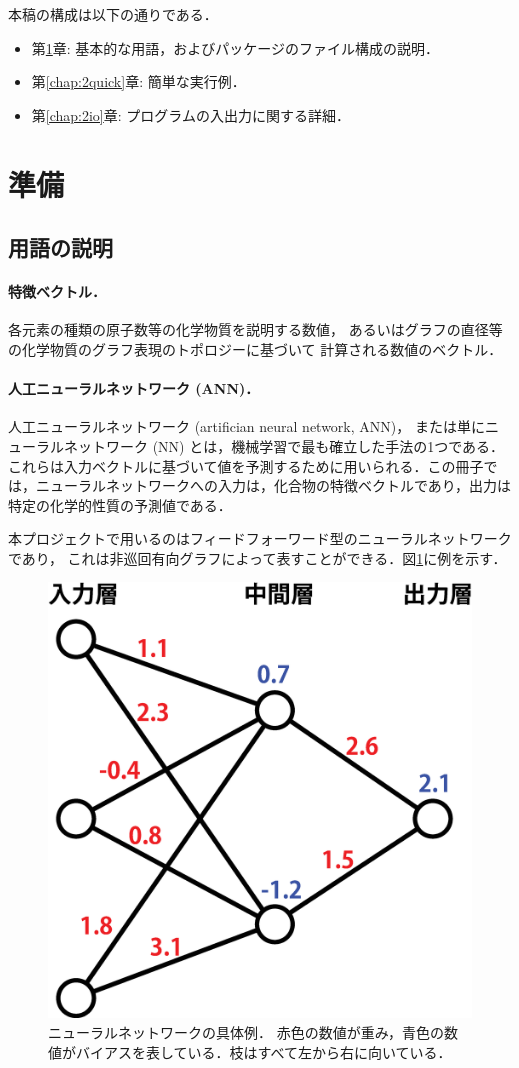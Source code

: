 \documentclass[11pt,titlepage,dvipdfmx,twoside]{jsbook}
\newcommand{\chapref}[1]{第\ref{chap:#1}章}
\newcommand{\figref}[1]{図\ref{fig:#1}}
\begin{document}
本稿の構成は以下の通りである．
\begin{itemize}
\item \chapref{2preparation}: 基本的な用語，およびパッケージのファイル構成の説明．
\item \chapref{2quick}: 簡単な実行例．
\item \chapref{2io}: プログラムの入出力に関する詳細．
\end{itemize}

\section{準備}
\label{chap:2preparation}

\subsection{用語の説明}
\paragraph{特徴ベクトル．}
各元素の種類の原子数等の化学物質を説明する数値，
あるいはグラフの直径等の化学物質のグラフ表現のトポロジーに基づいて
計算される数値のベクトル．

\paragraph{人工ニューラルネットワーク (ANN)．}
人工ニューラルネットワーク (artifician neural network, ANN)，
または単にニューラルネットワーク (NN) とは，機械学習で最も確立した手法の1つである．これらは入力ベクトルに基づいて値を予測するために用いられる．この冊子では，ニューラルネットワークへの入力は，化合物の特徴ベクトルであり，出力は特定の化学的性質の予測値である．

本プロジェクトで用いるのはフィードフォーワード型のニューラルネットワークであり，
これは非巡回有向グラフによって表すことができる．\figref{sample}に例を示す．

\begin{figure}[h!]
   \centering
   \includegraphics[width = 0.4 \textwidth]{./fig/ANN_sample_jp}
   \caption{ニューラルネットワークの具体例．
   赤色の数値が重み，青色の数値がバイアスを表している．枝はすべて左から右に向いている．}
   \label{fig:sample}
\end{figure}
\end{document}
